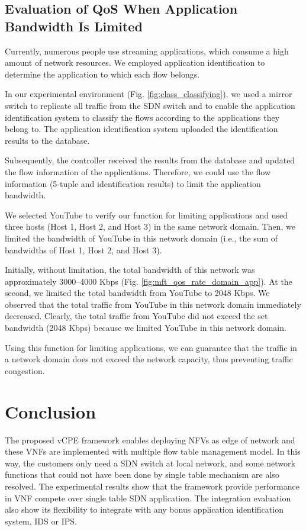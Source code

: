 \documentclass[journal]{IEEEtran}
\begin{document}
\subsection{Evaluation of QoS When Application Bandwidth Is Limited}
Currently, numerous people use streaming applications, which consume a high amount of network resources. We employed application identification to determine the application to which each flow belongs.

In our experimental environment (Fig. \ref{fig:class_classifying}), we used a mirror switch to replicate all traffic from the SDN switch and to enable the application identification system to classify the flows according to the applications they belong to. The application identification system uploaded the identification results to the database.


Subsequently, the controller received the results from the database and updated the flow information of the applications. Therefore, we could use the flow information (5-tuple and identification results) to limit the application bandwidth.

We selected YouTube to verify our function for limiting applications and used three hosts (Host 1, Host 2, and Host 3) in the same network domain. Then, we limited the bandwidth of YouTube in this network domain (i.e., the sum of bandwidths of Host 1, Host 2, and Host 3).

Initially, without limitation, the total bandwidth of this network was approximately 3000–4000 Kbps (Fig. \ref{fig:mft_qos_rate_domain_app}). At the  second, we limited the total bandwidth from YouTube to 2048 Kbps. We observed that the total traffic from YouTube in this network domain immediately decreased. Clearly, the total traffic from YouTube did not exceed the set bandwidth (2048 Kbps) because we limited YouTube in this network domain.

Using this function for limiting applications, we can guarantee that the traffic in a network domain does not exceed the network capacity, thus preventing traffic congestion.



\section{Conclusion}
The proposed vCPE framework enables deploying NFVs as edge of network and these VNFs are implemented with multiple flow table management model. In this way, the customers only need a SDN switch at local network, and some network functions that could not have been done by single table mechanism are also resolved. The experimental results show that the framework provide performance in VNF compete over single table SDN application. The integration evaluation also show its flexibility to integrate with any bonus application identification system, IDS or IPS.
\end{document}
